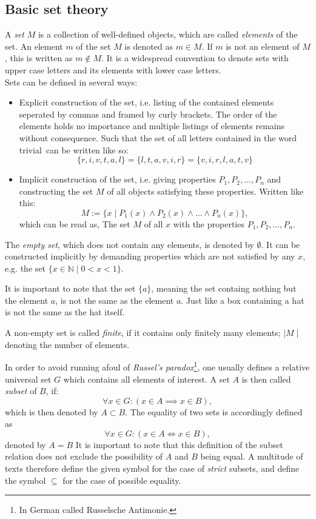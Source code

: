 \documentclass[12pt]{article}
\begin{document}
\subsection{Basic set theory}
A \textit{set} $M$ is a collection of well-defined objects, which are called \textit{elements} of the set. An element $m$ of the set $M$ is denoted as $m \in M$. If $m$ is not an element of $M$, this is written as $m \notin M$. It is a widespread convention to denote sets with upper case letters and its elements with lower case letters. \\
Sets can be defined in several ways:
\begin{itemize}
\item Explicit construction of the set, i.e. listing of the contained elements seperated by commas and framed by curly brackets. The order of the elements holds no importance and multiple listings of elements remains without consequence. Such that the set of all letters contained in the word \glqq trivial\grqq \ can be written like so:
\[
\{ r, i, v, t, a, l\} = \{ l, t, a, v, i, r\} = \{ v, i, r, l, a , t, v\}
\]
\item  Implicit construction of the set, i.e. giving properties $P_1, P_2, \dots , P_n$ and constructing the set $M$ of all objects satisfying these properties. Written like this:
\[
M:= \{ x \mid P_1(x) \land P_2(x)\land \dots \land P_n(x)\},
\]
which can be read as, \glqq The set $M$ of all $x$ with the properties $P_1, P_2, \dots , P_n$\grqq .
\end{itemize}
The \textit{empty set}, which does not contain any elements, is denoted by $\emptyset$. It can be constructed implicitly by demanding properties which are not satisfied by any $x$, e.g. the set $\{ x \in \mathbb{N} \mid 0 < x < 1\}$.

It is important to note that the set $\{ a\}$, meaning the set containg nothing but the element $a$, is not the same as the element $a$. Just like a box containing a hat is not the same as the hat itself.

A non-empty set is called \textit{finite}, if it contains only finitely many elements; $\mid M\mid$ denoting the number of elements.

In order to avoid running afoul of \textit{Russel's paradox}\footnote{In German called \glqq Russelsche Antimonie\grqq.}, one usually defines a relative universal set $G$ which contains all elements of interest. A set  $A$ is then called \textit{subset} of $B$, if:
\[
\forall x \in G : (x \in A \implies x \in B),
\]
which is then denoted by $A \subset B$.
The equality of two sets is accordingly defined as 
\[
\forall x \in G : (x \in A \iff x \in B),
\]
denoted by $A = B$
It is important to note that this definition of the subset relation does not exclude the possibility of $A$ and $B$ being equal. A multitude of texts therefore define the given symbol for the case of \textit{strict} subsets, and define the symbol $\subseteq$ for the case of possible equality. 
\end{document}

